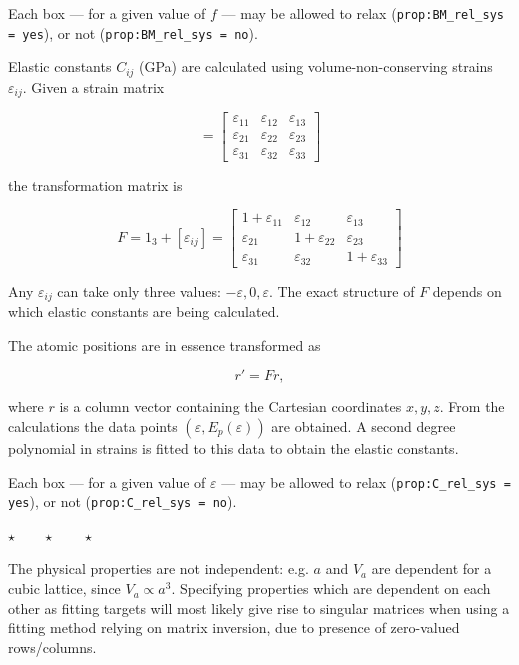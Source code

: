 \documentclass[a4paper,12pt,pdftex,onecolumn]{article}
\newcommand{\stars}{\begin{center}%
\vspace{1em plus 0.5em minus 0.5em}%
$\star \qquad \star \qquad \star$%
\vspace{1em plus 0.5em minus 0.5em}%
\end{center}}
\begin{document}
Each box --- for a given value of $f$ --- may be allowed to
relax (\verb+prop:BM_rel_sys = yes+),
or not (\verb+prop:BM_rel_sys = no+).


Elastic constants $C_{ij}$ (GPa) are calculated using volume-non-conserving strains
$\varepsilon_{ij}$. Given a strain matrix

\begin{equation}
[\varepsilon_{ij}] =
\left[
\begin{array}{ccc}
\varepsilon_{11} & \varepsilon_{12} & \varepsilon_{13} \\
\varepsilon_{21} & \varepsilon_{22} & \varepsilon_{23} \\
\varepsilon_{31} & \varepsilon_{32} & \varepsilon_{33}
\end{array}
\right]
\end{equation}

the transformation matrix is

\begin{equation}
F = 1_3 + [\varepsilon_{ij}] =
\left[
\begin{array}{ccc}
1+\varepsilon_{11} & \varepsilon_{12} & \varepsilon_{13} \\
\varepsilon_{21} & 1+\varepsilon_{22} & \varepsilon_{23} \\
\varepsilon_{31} & \varepsilon_{32} & 1+\varepsilon_{33}
\end{array}
\right]
\end{equation}

Any $\varepsilon_{ij}$ can take only three values: $-\varepsilon, 0, \varepsilon$.
The exact structure of $F$ depends on which elastic constants are being
calculated.

The atomic positions are in essence transformed as

\begin{equation}
r' = F r,
\end{equation}

where $r$ is a column vector containing the Cartesian coordinates $x,y,z$.
From the calculations the data points $(\varepsilon, E_p(\varepsilon))$ are obtained.
A second degree polynomial in strains is fitted to this data to obtain the elastic
constants.

Each box --- for a given value of $\varepsilon$ --- may be allowed to
relax (\verb+prop:C_rel_sys = yes+), or not (\verb+prop:C_rel_sys = no+).

\stars

The physical properties are not independent: e.g. $a$ and $V_a$ are dependent
for a cubic lattice, since $V_a \propto a^3$. Specifying properties which are
dependent on each other as fitting targets will most likely give rise to
singular matrices when using a fitting method relying on matrix inversion,
due to presence of zero-valued rows/columns.
\end{document}
